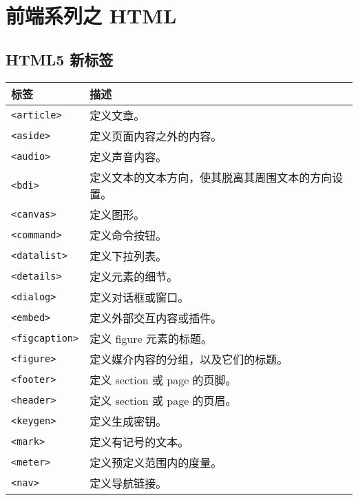 \section{前端系列之 HTML}\hypertarget{html}{}\label{html}

\subsection{HTML5 新标签}\hypertarget{html5-}{}\label{html5-}

\begin{longtable}{|l|l|}   %
\hline
标签 & 描述\\
\hline
\texttt{\textless{}article\textgreater{}} & 定义文章。\\
\texttt{\textless{}aside\textgreater{}} & 定义页面内容之外的内容。\\
\texttt{\textless{}audio\textgreater{}} & 定义声音内容。\\
\texttt{\textless{}bdi\textgreater{}} & 定义文本的文本方向，使其脱离其周围文本的方向设置。\\
\texttt{\textless{}canvas\textgreater{}} & 定义图形。\\
\texttt{\textless{}command\textgreater{}} & 定义命令按钮。\\
\texttt{\textless{}datalist\textgreater{}} & 定义下拉列表。\\
\texttt{\textless{}details\textgreater{}} & 定义元素的细节。\\
\texttt{\textless{}dialog\textgreater{}} & 定义对话框或窗口。\\
\texttt{\textless{}embed\textgreater{}} & 定义外部交互内容或插件。\\
\texttt{\textless{}figcaption\textgreater{}} & 定义 figure 元素的标题。\\
\texttt{\textless{}figure\textgreater{}} & 定义媒介内容的分组，以及它们的标题。\\
\texttt{\textless{}footer\textgreater{}} & 定义 section 或 page 的页脚。\\
\texttt{\textless{}header\textgreater{}} & 定义 section 或 page 的页眉。\\
\texttt{\textless{}keygen\textgreater{}} & 定义生成密钥。\\
\texttt{\textless{}mark\textgreater{}} & 定义有记号的文本。\\
\texttt{\textless{}meter\textgreater{}} & 定义预定义范围内的度量。\\
\texttt{\textless{}nav\textgreater{}} & 定义导航链接。\\

\end{longtable}
